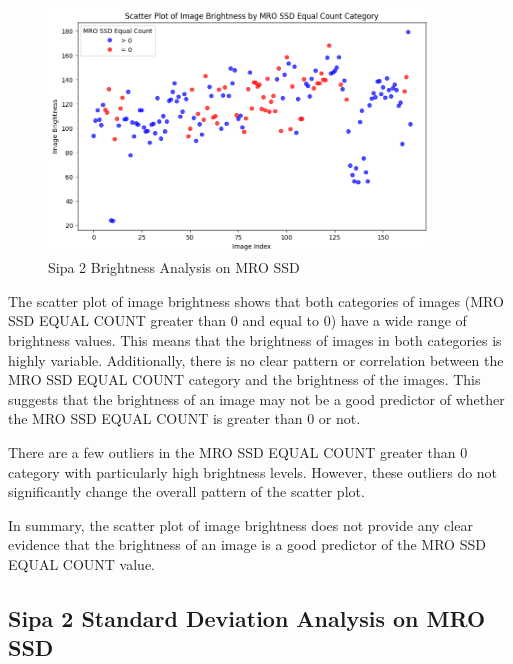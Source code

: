 \begin{figure}[ht]
    \centering
    \includegraphics[width=0.9\textwidth]{Figures/Results/sipa_02/brightness.png}
    \caption[Sipa 2 Brightness Analysis on MRO SSD]{Sipa 2 Brightness Analysis on MRO SSD}
    \label{fig:Sipa 2 Brightness Analysis on MRO SSD}
\end{figure}



The scatter plot of image brightness shows that both categories of images (MRO SSD EQUAL COUNT greater than 0 and equal to 0) have a wide range of brightness values. This means that the brightness of images in both categories is highly variable. Additionally, there is no clear pattern or correlation between the MRO SSD EQUAL COUNT category and the brightness of the images. This suggests that the brightness of an image may not be a good predictor of whether the MRO SSD EQUAL COUNT is greater than 0 or not.

There are a few outliers in the MRO SSD EQUAL COUNT greater than 0 category with particularly high brightness levels. However, these outliers do not significantly change the overall pattern of the scatter plot.

In summary, the scatter plot of image brightness does not provide any clear evidence that the brightness of an image is a good predictor of the MRO SSD EQUAL COUNT value.

\newpage

\subsection{Sipa 2 Standard Deviation Analysis on MRO SSD}


